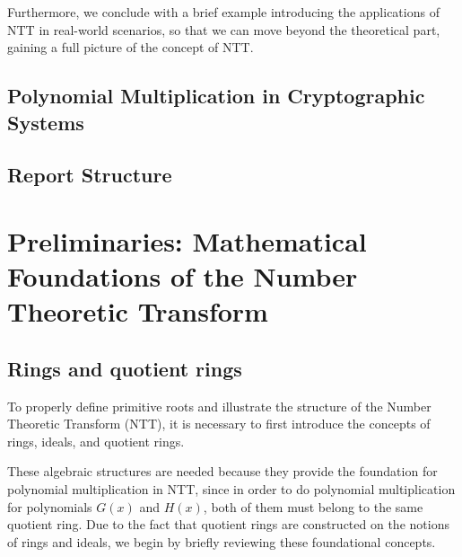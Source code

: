 \documentclass[12pt]{article}
\begin{document}
Furthermore, 
we conclude with a brief example introducing the applications of NTT in real-world scenarios, 
so that we can move beyond the theoretical part, gaining a full picture of the concept of NTT.

\subsection{Polynomial Multiplication in Cryptographic Systems}

\subsection{Report Structure}

\section{Preliminaries: Mathematical Foundations of the Number Theoretic Transform}



\subsection{Rings and quotient rings}

To properly define primitive roots and illustrate the structure of the Number Theoretic Transform (NTT), 
it is necessary to first introduce the concepts of rings, ideals, and quotient rings. 

These algebraic structures are needed because they provide the foundation for polynomial multiplication in NTT, 
since in order to do polynomial multiplication for polynomials $G(x)$ and $H(x)$, 
both of them must belong to the same quotient ring. 
Due to the fact that quotient rings are constructed on the notions of rings and ideals, 
we begin by briefly reviewing these foundational concepts.
\end{document}
